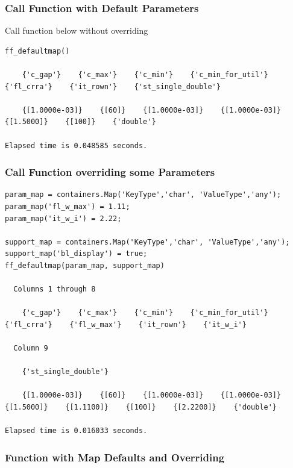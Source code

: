\documentclass[
]{book}
\begin{document}
\hypertarget{call-function-with-default-parameters}{%
\subsubsection{Call Function with Default Parameters}\label{call-function-with-default-parameters}}

Call function below without overriding

\begin{verbatim}
ff_defaultmap()

    {'c_gap'}    {'c_max'}    {'c_min'}    {'c_min_for_util'}    {'fl_crra'}    {'it_rown'}    {'st_single_double'}

    {[1.0000e-03]}    {[60]}    {[1.0000e-03]}    {[1.0000e-03]}    {[1.5000]}    {[100]}    {'double'}

Elapsed time is 0.048585 seconds.
\end{verbatim}

\hypertarget{call-function-overriding-some-parameters}{%
\subsubsection{Call Function overriding some Parameters}\label{call-function-overriding-some-parameters}}

\begin{verbatim}
param_map = containers.Map('KeyType','char', 'ValueType','any');
param_map('fl_w_max') = 1.11;
param_map('it_w_i') = 2.22;

support_map = containers.Map('KeyType','char', 'ValueType','any');
support_map('bl_display') = true;
ff_defaultmap(param_map, support_map)

  Columns 1 through 8

    {'c_gap'}    {'c_max'}    {'c_min'}    {'c_min_for_util'}    {'fl_crra'}    {'fl_w_max'}    {'it_rown'}    {'it_w_i'}

  Column 9

    {'st_single_double'}

    {[1.0000e-03]}    {[60]}    {[1.0000e-03]}    {[1.0000e-03]}    {[1.5000]}    {[1.1100]}    {[100]}    {[2.2200]}    {'double'}

Elapsed time is 0.016033 seconds.
\end{verbatim}

\hypertarget{function-with-map-defaults-and-overriding}{%
\subsubsection{Function with Map Defaults and Overriding}\label{function-with-map-defaults-and-overriding}}
\end{document}
